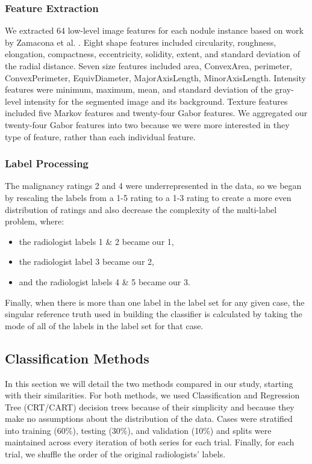 \documentclass[]{spie}
\begin{document}
\subsubsection{Feature Extraction}
We extracted 64 low-level image features for each nodule instance based on work by Zamacona et al. \cite{Zamacona13}. Eight shape features included circularity, roughness, elongation, compactness, eccentricity, solidity, extent, and standard deviation of the radial distance. Seven size features included area, ConvexArea, perimeter, ConvexPerimeter, EquivDiameter, MajorAxisLength, MinorAxisLength. Intensity features were minimum, maximum, mean, and standard deviation of the gray-level intensity for the segmented image and its background. Texture features included five Markov features and twenty-four Gabor features. We aggregated our twenty-four Gabor features into two because we were more interested in they type of feature, rather than each individual feature.
\subsubsection{Label Processing}
The malignancy ratings 2 and 4 were underrepresented in the data, so we began by rescaling the labels from a 1-5 rating to a 1-3 rating to create a more even distribution of ratings and also decrease the complexity of the multi-label problem, where: 
\begin{itemize}
\item the radiologist labels 1 \& 2 became our 1,
\item the radiologist label 3 became our 2,
\item and the radiologist labels 4 \& 5 became our 3.
\end{itemize} 
Finally, when there is more than one label in the label set for any given case, the singular reference truth used in building the classifier is calculated by taking the mode of all of the labels in the label set for that case. 
\subsection{Classification Methods}
In this section we will detail the two methods compared in our study, starting with their similarities. For both methods, we used Classification and Regression Tree (CRT/CART)\cite{Breiman84} decision trees because of their simplicity and because they make no assumptions about the distribution of the data. Cases were stratified into training (60\%), testing (30\%), and validation (10\%) and splits were maintained across every iteration of both series for each trial. Finally, for each trial, we shuffle the order of the original radiologists' labels.
\end{document}
